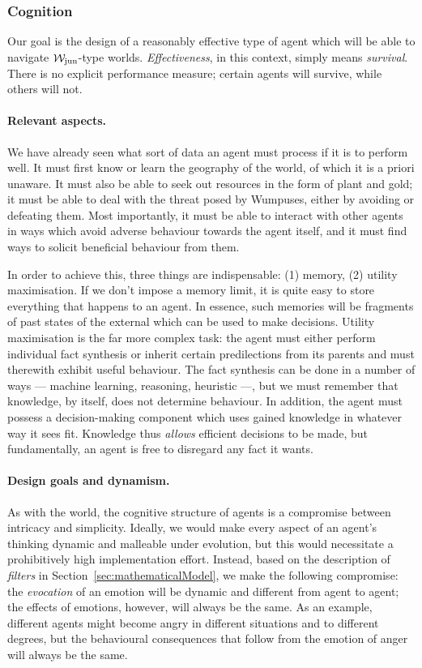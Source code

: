 \subsubsection{Cognition}

Our goal is the design of a reasonably effective type of agent which will be able to navigate $\mathcal{W}_{\mathrm{jun}}$-type worlds. \emph{Effectiveness}, in this context, simply means \emph{survival}. There is no explicit performance measure; certain agents will survive, while others will not.

\paragraph{Relevant aspects.} We have already seen what sort of data an agent must process if it is to perform well. It must first know or learn the geography of the world, of which it is a priori unaware. It must also be able to seek out resources in the form of plant and gold; it must be able to deal with the threat posed by Wumpuses, either by avoiding or defeating them. Most importantly, it must be able to interact with other agents in ways which avoid adverse behaviour towards the agent itself, and it must find ways to solicit beneficial behaviour from them.

In order to achieve this, three things are indispensable: (1) memory, (2) utility maximisation. If we don't impose a memory limit, it is quite easy to store everything that happens to an agent. In essence, such memories will be fragments of past states of the external which can be used to make decisions. Utility maximisation is the far more complex task: the agent must either perform individual fact synthesis or inherit certain predilections from its parents and must therewith exhibit useful behaviour. The fact synthesis can be done in a number of ways --- machine learning, reasoning, heuristic ---, but we must remember that knowledge, by itself, does not determine behaviour. In addition, the agent must possess a decision-making component which uses gained knowledge in whatever way it sees fit. Knowledge thus  {\em allows} efficient decisions to be made, but fundamentally, an agent is free to disregard any fact it wants.

\paragraph{Design goals and dynamism.} As with the world, the cognitive structure of agents is a compromise between intricacy and simplicity. Ideally, we would make every aspect of an agent's thinking dynamic and malleable under evolution, but this would necessitate a prohibitively high implementation effort. Instead, based on the description of \emph{filters} in Section~\ref{sec:mathematicalModel}, we make the following compromise: the {\em evocation} of an emotion will be dynamic and different from agent to agent; the effects of emotions, however, will always be the same. As an example, different agents might become angry in different situations and to different degrees, but the behavioural consequences that follow from the emotion of anger will always be the same.

